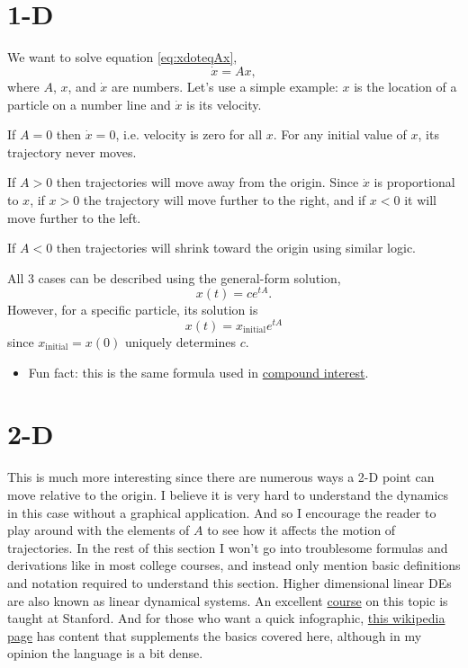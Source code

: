 \documentclass[11pt, oneside]{article}   	%
\begin{document}
\section{1-D}

We want to solve equation \ref*{eq:xdoteqAx},
$$\dot{x} = Ax,$$
where $A$, $x$, and $\dot{x}$ are numbers.
Let's use a simple example: $x$ is the location of a particle on a number line and $\dot{x}$ is its velocity.

If $A = 0$ then $\dot{x} = 0$, i.e. velocity is zero for all $x$.
For any initial value of $x$, its trajectory never moves.

If $A > 0$ then trajectories will move away from the origin.
Since $\dot{x}$ is proportional to $x$,
if $x > 0$ the trajectory will move further to the right, and if $x < 0$ it will move further to the left.

If $A < 0$ then trajectories will shrink toward the origin using similar logic.

All 3 cases can be described using the general-form solution,
\begin{equation}
  x(t) = ce^{tA} .
\end{equation}
However, for a specific particle, its solution is
\begin{equation} \label{eq:1Dsol}
  x(t) = x_\mathrm{initial} e^{tA}
\end{equation}
since $x_\mathrm{initial} = x(0)$ uniquely determines $c$.
\begin{itemize}
  \item Fun fact: this is the same formula used in
  \href{https://en.wikipedia.org/wiki/Compound_interest#Continuous_compounding}{compound interest}.
\end{itemize}

\section{2-D}

This is much more interesting since there are numerous ways a 2-D point can move relative to the origin.
I believe it is very hard to understand the dynamics in this case without a graphical application.
And so I encourage the reader to play around with the elements of $A$ to see how it affects the motion of trajectories.
In the rest of this section I won't go into troublesome formulas and derivations like in most college courses,
and instead only mention basic definitions and notation required to understand this section.
Higher dimensional linear DEs are also known as linear dynamical systems.
An excellent \href{https://see.stanford.edu/Course/EE263}{course} on this topic is taught at Stanford.
And for those who want a quick infographic,
\href{https://en.wikipedia.org/wiki/Stability_theory}{this wikipedia page} has content that supplements the basics covered here,
although in my opinion the language is a bit dense.
\end{document}
